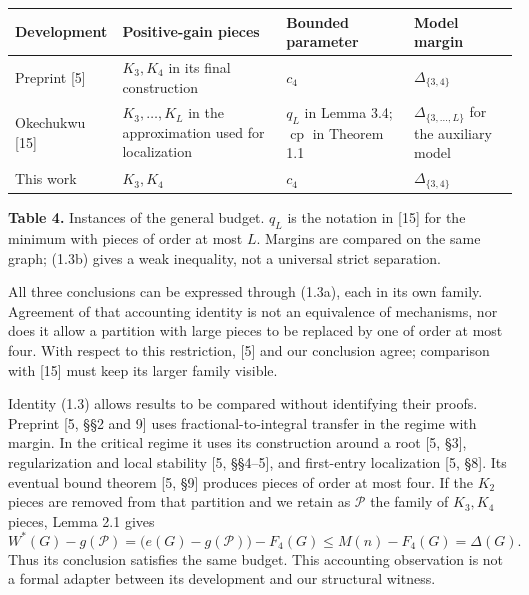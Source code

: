 \documentclass[english,11pt,a4paper]{article}
\newcounter{none}
\begin{document}
{\def\LTcaptype{none} %
\begin{longtable}[c]{@{}
  >{\raggedright\arraybackslash}p{}
  >{\raggedright\arraybackslash}p{}
  >{\raggedright\arraybackslash}p{}
  >{\raggedright\arraybackslash}p{}@{}}
\toprule\noalign{}
\begin{minipage}[b]{\linewidth}\raggedright
Development
\end{minipage} & \begin{minipage}[b]{\linewidth}\raggedright
Positive-gain pieces
\end{minipage} & \begin{minipage}[b]{\linewidth}\raggedright
Bounded parameter
\end{minipage} & \begin{minipage}[b]{\linewidth}\raggedright
Model margin
\end{minipage} \\
\midrule\noalign{}
\endhead
\bottomrule\noalign{}
\endlastfoot
Preprint {[}5{]} & \(K_3,K_4\) in its final construction & \(c_4\) & \(\Delta_{\{3,4\}}\) \\
Okechukwu {[}15{]} & \(K_3,\ldots,K_L\) in the approximation used for localization & \(q_L\) in Lemma 3.4; \(\operatorname{cp}\) in Theorem 1.1 & \(\Delta_{\{3,\ldots,L\}}\) for the auxiliary model \\
This work & \(K_3,K_4\) & \(c_4\) & \(\Delta_{\{3,4\}}\) \\
\end{longtable}
}

\textbf{Table 4.} Instances of the general budget. \(q_L\) is the notation in {[}15{]} for the minimum with pieces of order at most \(L\). Margins are compared on the same graph; (1.3b) gives a weak inequality, not a universal strict separation.

All three conclusions can be expressed through (1.3a), each in its own family. Agreement of that accounting identity is not an equivalence of mechanisms, nor does it allow a partition with large pieces to be replaced by one of order at most four. With respect to this restriction, {[}5{]} and our conclusion agree; comparison with {[}15{]} must keep its larger family visible.

Identity (1.3) allows results to be compared without identifying their proofs. Preprint {[}5, §§2 and 9{]} uses fractional-to-integral transfer in the regime with margin. In the critical regime it uses its construction around a root {[}5, §3{]}, regularization and local stability {[}5, §§4--5{]}, and first-entry localization {[}5, §8{]}. Its eventual bound theorem {[}5, §9{]} produces pieces of order at most four. If the \(K_2\) pieces are removed from that partition and we retain as \(\mathcal P\) the family of \(K_3,K_4\) pieces, Lemma 2.1 gives \[
W^*(G)-g(\mathcal P)
=\bigl(e(G)-g(\mathcal P)\bigr)-F_4(G)
\le M(n)-F_4(G)=\Delta(G).
\tag{8.1}
\] Thus its conclusion satisfies the same budget. This accounting observation is not a formal adapter between its development and our structural witness.
\end{document}
